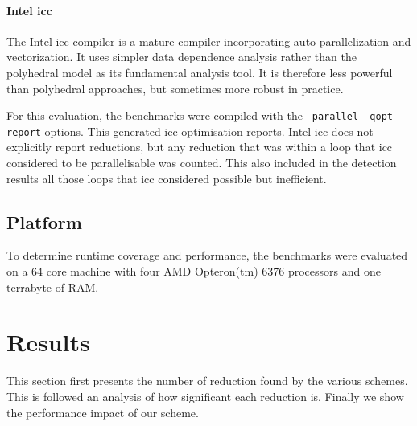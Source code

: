 \paragraph*{Intel icc}

    The Intel icc compiler is a mature compiler incorporating
    auto-parallelization and vectorization.
    It uses simpler data dependence analysis rather than the polyhedral model as
    its fundamental analysis tool.
    It is therefore less powerful than polyhedral approaches, but sometimes more
    robust in practice.

    For this evaluation, the benchmarks were compiled with the
    \texttt{-parallel -qopt-report} options.
    This generated icc optimisation reports.
    Intel icc does not explicitly report reductions, but any reduction that was
    within a loop that icc considered to be parallelisable was counted.
    This also included in the detection results all those loops that icc
    considered possible but inefficient.


\subsection{Platform}

    To determine runtime coverage and performance, the benchmarks were evaluated
    on a 64 core machine with four AMD Opteron(tm) 6376 processors and one
    terrabyte of RAM.





\section{Results}

This section first presents the number of reduction found by the
various schemes. This is followed an analysis of how significant each
reduction is. Finally we show the performance impact of our scheme.
   
